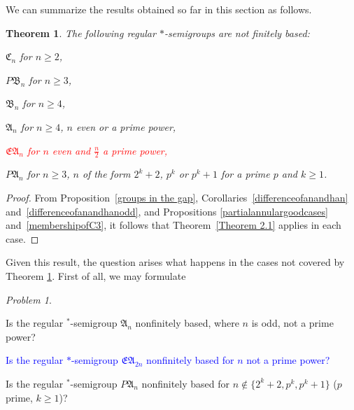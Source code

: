\documentclass[preprint,1p,times]{elsarticle}
\numberwithin{equation}{section}
\newtheorem{Thm}{Theorem}[section]
\theoremstyle{remark}
\newtheorem{Problem}{Problem}[section]
\def\red#1{\textcolor{red}{#1}}
\def\blue#1{\textcolor{blue}{#1}}
\def\A{\mathfrak{A}}
\def\C{\mathfrak{C}}
\def\B{\mathfrak{B}}
\begin{document}
We can summarize the results obtained so far in this section as follows.

\begin{Thm}
\label{mainresultpartitionsemigroups} The following regular $*$-semigroups are not finitely based:
\begin{enumerate}
\item $\C_n$  for $n\ge 2$,
\item $P\B_n$ for $n\ge 3$,
\item $\B_n$ for $n\ge 4$,
\item $\A_n$ for $n\ge 4$, $n$ even or a prime power,
\red{\item $\mathfrak{EA}_n$ for $n$ even and $\frac n2$ a prime power,}
\item $P\A_n$ for $n\ge 3$, $n$ of the form $2^k+2$, $p^k$ or $p^k+1$ for
a  prime $p$ and $k\ge 1$.
\end{enumerate}
\end{Thm}

\begin{proof}
From Proposition~\ref{groups in the gap}, Corollaries~\ref{differenceofanandhan} and~\ref{differenceofanandhanodd}, and
Propositions \ref{partialannulargoodcases} and~\ref{membershipofC3}, it follows that Theorem~\ref{Theorem 2.1} applies
in each case.
\end{proof}

Given this result, the question arises what happens in the cases not covered by Theorem
\ref{mainresultpartitionsemigroups}. First of all, we may formulate
\begin{Problem}
\begin{enumerate}
\item  Is the regular $^*$-semigroup $\A_n$ nonfinitely based, where $n$ is odd, not a prime power?
\blue{\item Is the regular $*$-semigroup $\mathfrak{EA}_{2n}$ nonfinitely based for $n$ not a prime power?}
\item Is the regular $^*$-semigroup $P\A_n$ nonfinitely based for $n\notin\{2^k+2,p^k,p^k+1\}$
($p$  prime, $k\ge 1$)?
\end{enumerate}
\end{Problem}
\end{document}
